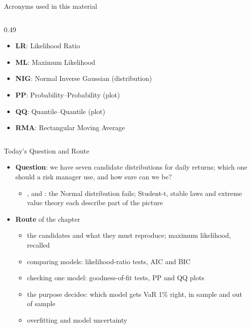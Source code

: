 \begin{frame}{Acronyms used in this material}
\begin{columns}[T]
\begin{column}{0.49\textwidth}
\begin{itemize}
    \item \textbf{LR}: Likelihood Ratio
    \item \textbf{ML}: Maximum Likelihood
    \item \textbf{NIG}: Normal Inverse Gaussian (distribution)
    \item \textbf{PP}: Probability–Probability (plot)
    \item \textbf{QQ}: Quantile–Quantile (plot)
    \item \textbf{RMA}: Rectangular Moving Average
\end{itemize}
\end{column}
\end{columns}
\end{frame}

\begin{frame}{Today's Question and Route}
\itemsize{\small}
\begin{itemize}
    \item \textbf{Question}: we have seven candidate distributions for daily returns; which one should a risk manager use, and how sure can we be?
    \begin{itemize}
        \item {},  and : the Normal distribution fails; Student-t, stable laws and extreme value theory each describe part of the picture
    \end{itemize}
    \item \textbf{Route} of the chapter
    \begin{itemize}
        \item the candidates and what they must reproduce; maximum likelihood, recalled
        \item comparing models: likelihood-ratio tests, AIC and BIC
        \item checking one model: goodness-of-fit tests, PP and QQ plots
        \item the purpose decides: which model gets VaR 1\% right, in sample and out of sample
        \item overfitting and model uncertainty
    \end{itemize}
\end{itemize}
\end{frame}

